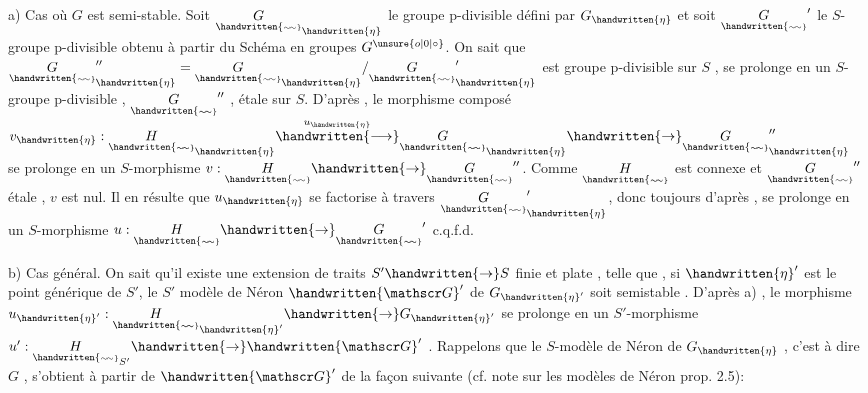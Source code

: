a) Cas où $G$ est semi-stable. Soit $\underset{\handwritten{\scriptscriptstyle\sim\!\sim}}{G}_{\handwritten{\eta}}$ le groupe p-divisible défini par $G_{\handwritten{\eta}}$
et soit $\underset{\handwritten{\scriptscriptstyle\sim\!\sim}}{G}'$ le $S$-groupe p-divisible obtenu à partir du Schéma en groupes $G^{\unsure{o|0|\circ}}$.
On sait que $\underset{\handwritten{\scriptscriptstyle\sim\!\sim}}{G}''_{\handwritten{\eta}}=\underset{\handwritten{\scriptscriptstyle\sim\!\sim}}{G}_{\handwritten{\eta}}/\underset{\handwritten{\scriptscriptstyle\sim\!\sim}}{G}'_{\handwritten{\eta}}$ est  groupe p-divisible   sur $S$ ,  
se prolonge en un $S$-groupe p-divisible , $\underset{\handwritten{\scriptscriptstyle\sim\!\sim}}{G}''$ , étale sur $S$. D'après ,
le morphisme composé $v_{\handwritten{\eta}}:\underset{\handwritten{\scriptscriptstyle\sim\!\sim}}{H}_{\handwritten{\eta}}\overset{u_{\handwritten{\eta}}}{\handwritten{\longrightarrow}}\underset{\handwritten{\scriptscriptstyle\sim\!\sim}}{G}_{\handwritten{\eta}}\handwritten{\to}\underset{\handwritten{\scriptscriptstyle\sim\!\sim}}{G}''_{\handwritten{\eta}}$ se prolonge en un $S$-morphisme
$v:\underset{\handwritten{\scriptscriptstyle\sim\!\sim}}{H}\handwritten{\to}\underset{\handwritten{\scriptscriptstyle\sim\!\sim}}{G}''$. Comme $\underset{\handwritten{\scriptscriptstyle\sim\!\sim}}{H}$ est connexe et $\underset{\handwritten{\scriptscriptstyle\sim\!\sim}}{G}''$ étale , $v$ est nul.  Il en résulte
que $u_{\handwritten{\eta}}$ se factorise à travers $\underset{\handwritten{\scriptscriptstyle\sim\!\sim}}{G}'_{\handwritten{\eta}}$, donc toujours d'après , se prolonge en un $S$-morphisme $u:\underset{\handwritten{\scriptscriptstyle\sim\!\sim}}{H}\handwritten{\to}\underset{\handwritten{\scriptscriptstyle\sim\!\sim}}{G}'$ c.q.f.d.

b) Cas général. On sait qu'il existe une extension de traits $S'\handwritten{\to} S$\handwritten{,}
finie et plate , telle que , si $\handwritten{\eta}'$ est le point générique de $S'$, le $S'$
modèle de Néron $\handwritten{\mathscr G}'$ de $G_{\handwritten{\eta}'}$ soit semi\inserted{\handwritten{-}}stable . D'après a) , le morphisme
$u_{\handwritten{\eta}'}:\underset{\handwritten{\scriptscriptstyle\sim\!\sim}}{H}_{\handwritten{\eta}'}\handwritten{\to}G_{\handwritten{\eta}'}$ se prolonge en un $S'$-morphisme $u':\underset{\handwritten{\scriptscriptstyle\sim\!\sim}}{H}_{S'}\handwritten{\to}\handwritten{\mathscr G}'$ . Rappelons
que le $S$-modèle de Néron de $G_{\handwritten{\eta}}$ , c'est à dire $G$ , s'obtient à partir de $\handwritten{\mathscr G}'$
de la façon suivante (cf. note sur les modèles de Néron prop. 2.5):

